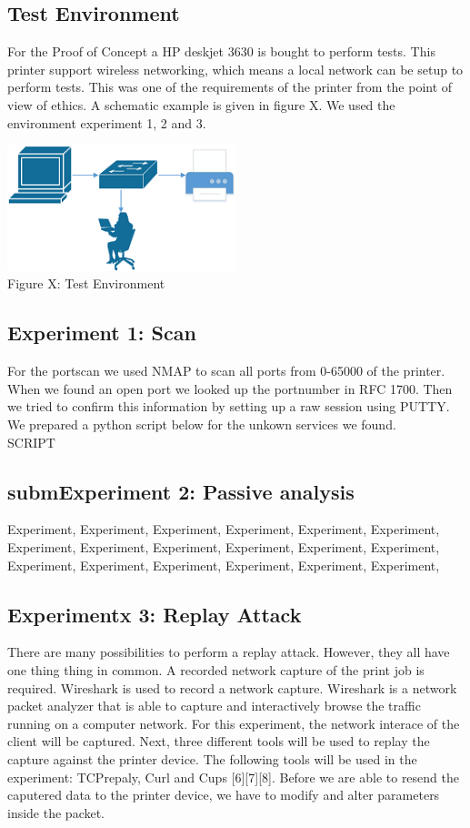 \documentclass[a4paper]{article}
\begin{document}
\subsection{Test Environment}
For the Proof of Concept a HP deskjet 3630 is bought to perform tests. This printer support wireless networking, which means a local network can be setup to perform tests. This was one of the requirements of the printer from the point of view of ethics. A schematic example is given in figure X. We used the environment experiment 1, 2 and 3.
\begin{center}
	\includegraphics[width=0.5\textwidth]{testenv.png}\\
	Figure X: Test Environment
\end{center}

\subsection{Experiment 1: Scan}
For the portscan we used NMAP to scan all ports from 0-65000 of the printer. When we found an open port we looked up the portnumber in RFC 1700. Then we tried to confirm this information by setting up a raw session using PUTTY. We prepared a python script below for the unkown services we found.\\
SCRIPT

\subsection{submExperiment 2: Passive analysis}
Experiment, Experiment, Experiment, Experiment, Experiment, Experiment, Experiment, Experiment, Experiment, Experiment, Experiment, Experiment, Experiment, Experiment, Experiment, Experiment, Experiment, Experiment,

\subsection{Experimentx 3: Replay Attack }
There are many possibilities to perform a replay attack. However, they all
have one thing thing in common. A recorded network capture of the print
job is required. Wireshark is used to record a network capture.
Wireshark is a network packet analyzer that is able to capture and
interactively browse the traffic running on a computer network. For this
experiment,  the network interace of the client will be captured. Next,
three different tools will be used to replay the capture against the
printer device. The following tools will be used in the experiment:
TCPrepaly, Curl and Cups [6][7][8]. Before we are able to resend the
caputered data to the printer device, we have to modify and alter
parameters inside the packet.
\end{document}
